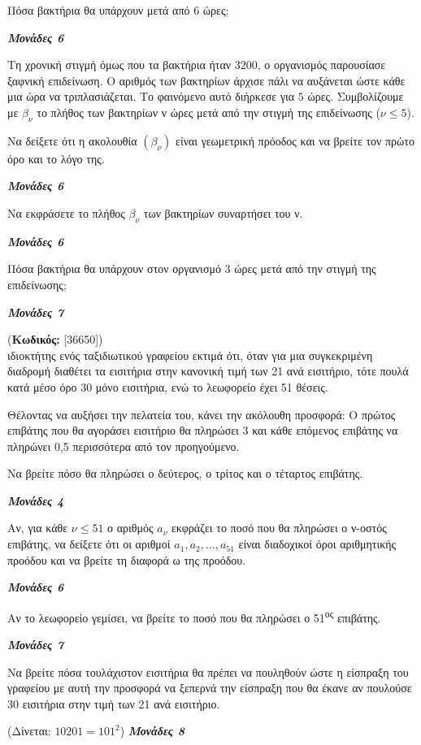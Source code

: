 \documentclass[11pt,a4paper,twoside]{book}
\newcounter{askhsh}[chapter]
\renewcommand{\theaskhsh}{
	\bf{\titlefont{\Large{\thechapter}}.\arabic{askhsh}}
}
\newcommand{\Askhsh}[2]{\refstepcounter{askhsh}{\titlefont{Άσκηση\theaskhsh} - \textcolor{maincolor}{ΘΕΜΑ #2}} (\small{\textbf{Κωδικός:} #1})\\}{}
\newcommand{\monades}[1]{
\hspace*{\fill}
\textbf{\textit{\textcolor{maincolor}{Μονάδες #1}}}}
\begin{document}
\begin{alist}
\item Πόσα βακτήρια θα υπάρχουν μετά από $6$ ώρες;
\monades{6}
\item Τη χρονική στιγμή όμως που τα βακτήρια ήταν $3200$, ο οργανισμός παρουσίασε ξαφνική επιδείνωση. Ο αριθμός των βακτηρίων άρχισε πάλι να αυξάνεται ώστε κάθε μια ώρα να τριπλασιάζεται. Το φαινόμενο αυτό διήρκεσε για $5$ ώρες. Συμβολίζουμε με $\beta_\nu$ το πλήθος των βακτηρίων ν ώρες μετά από την στιγμή της επιδείνωσης ($\nu \le 5$).
\begin{rlist}
\item
  Να δείξετε ότι η ακολουθία $(\beta_\nu)$ είναι γεωμετρική πρόοδος και να βρείτε τον πρώτο όρο και το λόγο της.
\monades{6}
\item
  Να εκφράσετε το πλήθος $\beta_\nu$ των βακτηρίων συναρτήσει του ν.
\monades{6}
\item
  Πόσα βακτήρια θα υπάρχουν στον οργανισμό $3$ ώρες μετά από την στιγμή της επιδείνωσης;
\monades{7}
\end{rlist}
\end{alist}
\vspace{4mm}

\Askhsh{[36650]}
Ο ιδιοκτήτης ενός ταξιδιωτικού γραφείου εκτιμά ότι, όταν για μια συγκεκριμένη διαδρομή διαθέτει τα εισιτήρια στην κανονική τιμή των 21\text{\euro} ανά εισιτήριο, τότε πουλά κατά μέσο όρο 30 μόνο εισιτήρια, ενώ το λεωφορείο έχει 51 θέσεις.

Θέλοντας να αυξήσει την πελατεία του, κάνει την ακόλουθη προσφορά: Ο πρώτος επιβάτης που θα αγοράσει εισιτήριο θα πληρώσει 3\text{\euro} και κάθε επόμενος επιβάτης να πληρώνει 0,5\text{\euro} περισσότερα από τον προηγούμενο.

\begin{alist}
\item Να βρείτε πόσο θα πληρώσει ο δεύτερος, ο τρίτος και ο τέταρτος επιβάτης.

\monades{4}
\item Αν, για κάθε $\nu \le 51$ ο αριθμός $a_\nu$ εκφράζει το ποσό που θα πληρώσει ο ν-οστός επιβάτης, να δείξετε ότι οι αριθμοί $a_1, a_2, \dots, a_{51}$ είναι διαδοχικοί όροι αριθμητικής προόδου και να βρείτε τη διαφορά ω της προόδου.
\monades{6}
\item Αν το λεωφορείο γεμίσει, να βρείτε το ποσό που θα πληρώσει ο 51\textsuperscript{ος} επιβάτης.

\monades{7}
\item Να βρείτε πόσα τουλάχιστον εισιτήρια θα πρέπει να πουληθούν ώστε η είσπραξη του γραφείου με αυτή την προσφορά να ξεπερνά την είσπραξη που θα έκανε αν πουλούσε 30 εισιτήρια στην τιμή των 21\text{\euro} ανά εισιτήριο.

(Δίνεται: $10201 = 101^2$) \monades{8}
\end{alist}
\end{document}

